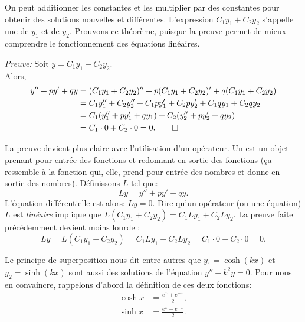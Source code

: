 On peut additionner les constantes et les multiplier par des constantes pour obtenir des solutions nouvelles et différentes.  L'expression $C_1 y_1 + C_2 y_2$ s'appelle une
\emph{} de $y_1$ et de $y_2$.
Prouvons ce théorème, puisque la preuve permet de mieux comprendre le fonctionnement des équations linéaires.

\medskip

\emph{Preuve:}
Soit 
$y = C_1 y_1 + C_2 y_2$. \\
Alors,
\begin{align*}
y'' + py' + qy & =	(C_1 y_1 + C_2 y_2)'' + p(C_1 y_1 + C_2 y_2)' + q(C_1 y_1 + C_2 y_2) \\
				& = C_1 y_1'' + C_2 y_2'' + C_1 p y_1' + C_2 p y_2' + C_1 q y_1 + C_2 q y_2 \\
				& = C_1 ( y_1'' + p y_1' + q y_1 ) + C_2 ( y_2'' + p y_2' + q y_2 ) \\
				& = C_1 \cdot 0 + C_2 \cdot 0 = 0 . \qed
\end{align*}

\medskip

La preuve devient plus claire avec l'utilisation d'un opérateur.
Un \emph{} est un objet prenant pour entrée des fonctions et redonnant en sortie des fonctions (ça ressemble à la fonction qui, elle, prend pour entrée des nombres et donne en sortie des nombres).
Définissons $L$ tel que: 
\begin{equation*}
	Ly = y'' + py' + qy .
\end{equation*}
L'équation différentielle est alors: $Ly=0$.
Dire qu'un opérateur (ou une équation)
$L$ est  \emph{linéaire} implique que $L(C_1y_1 + C_2y_2) = 
C_1 Ly_1 + C_2 Ly_2$.  La preuve faite précédemment devient moins lourde :
\begin{equation*}
	Ly = L(C_1y_1 + C_2y_2) = 	C_1 Ly_1 + C_2 Ly_2 = C_1 \cdot 0 + C_2 \cdot 0 = 0 .
\end{equation*}

\medskip

Le principe de superposition nous dit entre autres que $y_1 = \cosh (kx)$ et $y_2 = \sinh (kx)$ sont aussi des solutions de l'équation $y'' - k^2y = 0$.  Pour nous en convaincre, rappelons d'abord la définition de ces deux fonctions:
\begin{align*}
	\cosh x & = \frac{e^x  + e^{-x}}{2}, \\
	\sinh x  & = \frac{e^x - e^{-x}}{2}.
\end{align*}


